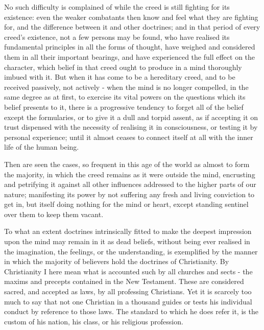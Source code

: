 No such difficulty is complained of while the creed is still fighting for its existence: even the weaker combatants then know and feel what they are fighting for, and the difference between it and other doctrines; and in that period of every creed’s existence, not a few persons may be found, who have realised its fundamental principles in all the forms of thought, have weighed and considered them in all their important bearings, and have experienced the full effect on the character, which belief in that creed ought to produce in a mind thoroughly imbued with it. But when it has come to be a hereditary creed, and to be received passively, not actively - when the mind is no longer compelled, in the same degree as at first, to exercise its vital powers on the questions which its belief presents to it, there is a progressive tendency to forget all of the belief except the formularies, or to give it a dull and torpid assent, as if accepting it on trust dispensed with the necessity of realising it in consciousness, or testing it by personal experience; until it almost ceases to connect itself at all with the inner life of the human being.\par

Then are seen the cases, so frequent in this age of the world as almost to form the majority, in which the creed remains as it were outside the mind, encrusting and petrifying it against all other influences addressed to the higher parts of our nature; manifesting its power by not suffering any fresh and living conviction to get in, but itself doing nothing for the mind or heart, except standing sentinel over them to keep them vacant.\par

To what an extent doctrines intrinsically fitted to make the deepest impression upon the mind may remain in it as dead beliefs, without being ever realised in the imagination, the feelings, or the understanding, is exemplified by the manner in which the majority of believers hold the doctrines of Christianity. By Christianity I here mean what is accounted such by all churches and sects - the maxims and precepts contained in the New Testament. These are considered sacred, and accepted as laws, by all professing Christians. Yet it is scarcely too much to say that not one Christian in a thousand guides or tests his individual conduct by reference to those laws. The standard to which he does refer it, is the custom of his nation, his class, or his religious profession.\par

